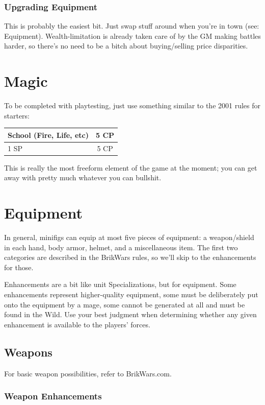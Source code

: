 \documentclass[12pt,a4paper,twocolumn]{article}
\begin{document}
\subsubsection{Upgrading Equipment}

This is probably the easiest bit.  Just swap stuff around when you're in town (see: Equipment).  Wealth-limitation is already taken care of by the GM making battles harder, so there's no need to be a bitch about buying/selling price disparities.

\section {Magic}

To be completed with playtesting, just use something similar to the 2001 rules for starters:

\begin{tabular}{|l|c|} \hline
School (Fire, Life, etc) & 5 CP \\ \hline
1 SP & 5 CP \\ \hline
\end{tabular}

This is really the most freeform element of the game at the moment; you can get away with pretty much whatever you can bullshit.

\section{Equipment}

In general, minifigs can equip at most five pieces of equipment: a weapon/shield in each hand, body armor, helmet, and a miscellaneous item.  The first two categories are described in the BrikWars rules, so we'll skip to the enhancements for those.  

Enhancements are a bit like unit Specializations, but for equipment.  Some enhancements represent higher-quality equipment, some must be deliberately put onto the equipment by a mage, some cannot be generated at all and must be found in the Wild.  Use your best judgment when determining whether any given enhancement is available to the players' forces.

\subsection{Weapons}

For basic weapon possibilities, refer to BrikWars.com.

\subsubsection {Weapon Enhancements}
\end{document}
